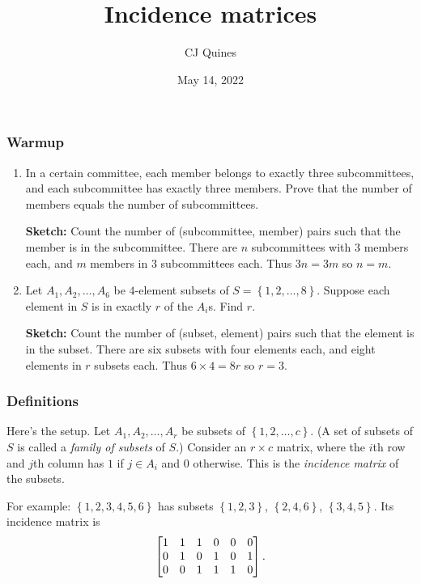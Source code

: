 \documentclass[11pt,paper=letter]{scrartcl}
\begin{document}
\title{Incidence matrices}
\author{CJ Quines}
\date{May 14, 2022}

\maketitle

\subsubsection*{Warmup}

\begin{enumerate}

\item In a certain committee, each member belongs to exactly three subcommittees, and each subcommittee has exactly three members. Prove that the number of members equals the number of subcommittees.

\textbf{Sketch:} Count the number of (subcommittee, member) pairs such that the member is in the subcommittee. There are $n$ subcommittees with $3$ members each, and $m$ members in $3$ subcommittees each. Thus $3n = 3m$ so $n = m$.

\item Let $A_1, A_2, \ldots, A_6$ be $4$-element subsets of $S = \left\{ 1, 2, \ldots, 8 \right\}$. Suppose each element in $S$ is in exactly $r$ of the $A_i$s. Find $r$.

\textbf{Sketch:} Count the number of (subset, element) pairs such that the element is in the subset. There are six subsets with four elements each, and eight elements in $r$ subsets each. Thus $6 \times 4 = 8r$ so $r = 3$.

\end{enumerate}

\subsubsection*{Definitions}

Here's the setup. Let $ A_1, A_2, \ldots, A_r $ be subsets of $ \left\{ 1, 2, \ldots, c \right\} $. (A set of subsets of $S$ is called a \textit{family of subsets} of $S$.) Consider an $ r \times c $ matrix, where the $i$th row and $j$th column has $1$ if $j \in A_i$ and $0$ otherwise. This is the \textit{incidence matrix} of the subsets.

For example: $ \left\{ 1, 2, 3, 4, 5, 6 \right\} $ has subsets $\left\{ 1, 2, 3 \right\}$, $\left\{ 2, 4, 6 \right\}$, $\left\{ 3, 4, 5 \right\}$. Its incidence matrix is \[
  \begin{bmatrix}1 & 1 & 1 & 0 & 0 & 0 \\ 0 & 1 & 0 & 1 & 0 & 1 \\ 0 & 0 & 1 & 1 & 1 & 0\end{bmatrix}.
\]
\end{document}
